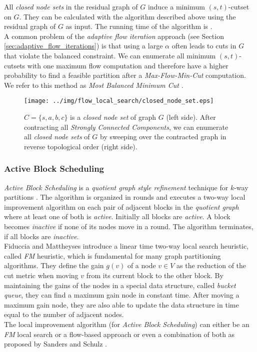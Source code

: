 All \emph{closed node sets} in the residual graph of $G$ induce a minimum $(s,t)$-cutset on $G$.
They can be calculated with the algorithm described above using the residual graph of
$G$ as input. The running time of the algorithm is . \\
A common problem of the \emph{adaptive flow iteration} approach (see Section \ref{sec:adaptive_flow_iterations}) is
that using a large $\alpha$ often leads to cuts in $G$ that violate the balanced constraint. 
We can enumerate all minimum $(s,t)$-cutsets with one maximum 
flow computation and therefore have a higher probability to find
a feasible partition after a \emph{Max-Flow-Min-Cut} computation. We refer to this method as
\emph{Most Balanced Minimum Cut} \cite{sanders2011engineering}.
\begin{figure}
\centering
\texttt{[image: ../img/flow\_local\_search/closed\_node\_set.eps]}
\caption{$C = \{s,a,b,c\}$ is a \emph{closed node set} of graph $G$ (left side).
         After contracting all \emph{Strongly Connected Components}, we can enumerate all
         \emph{closed node sets} of $G$ by sweeping over the contracted graph 
         in reverse topological order (right side).}
\label{img:closed_node_set}
\end{figure}


\subsubsection{Active Block Scheduling}
\label{sec:abs}
\emph{Active Block Scheduling} is a \emph{quotient graph style refinement} technique for
$k$-way partitions \cite{holtgrewe2010engineering,sanders2011engineering}. 
The algorithm is organized in rounds and executes a two-way 
local improvement algorithm on each pair of adjacent
blocks in the \emph{quotient graph} where at least one of both is \emph{active}. 
Initially all blocks are \emph{active}. A block becomes \emph{inactive}
if none of its nodes move in a round. The algorithm
terminates, if all blocks are \emph{inactive}. \\
Fiduccia and Mattheyses \cite{fiduccia1988linear} introduce a linear time
two-way local search heuristic, called \emph{FM} heuristic, 
which is fundamental for many graph partitioning algorithms.
They define the gain $g(v)$ of a node $v \in V$ as the reduction of the cut metric when
moving $v$ from its current block to the other block. By maintaining the gains of the
nodes in a special data structure, called \emph{bucket queue}, they can find a maximum
gain node in constant time. After moving a maximum gain node, they are also able to update the
data structure in time equal to the number of adjacent nodes.\\
The local improvement algorithm (for \emph{Active Block Scheduling}) can either 
be an \emph{FM} local search or a flow-based approach or even a combination of 
both as proposed by Sanders and Schulz \cite{sanders2011engineering}.

